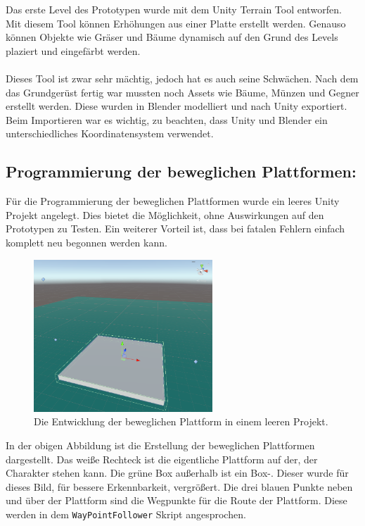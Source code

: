 Das erste Level des Prototypen wurde mit dem Unity Terrain Tool entworfen. Mit diesem Tool können Erhöhungen aus einer Platte erstellt werden. Genauso können Objekte wie Gräser und Bäume dynamisch auf den Grund des Levels plaziert und eingefärbt werden. \\\\
Dieses Tool ist zwar sehr mächtig, jedoch hat es auch seine Schwächen. Nach dem das Grundgerüst fertig war mussten noch Assets wie Bäume, Münzen und Gegner erstellt werden. Diese wurden in Blender modelliert und nach Unity exportiert. Beim Importieren war es wichtig, zu beachten, dass Unity und Blender ein unterschiedliches Koordinatensystem verwendet. 

\pagebreak


\subsection{Programmierung der beweglichen Plattformen:}

Für die Programmierung der beweglichen Plattformen wurde ein leeres Unity Projekt angelegt. Dies bietet die Möglichkeit, ohne Auswirkungen auf den Prototypen zu Testen. Ein weiterer Vorteil ist, dass bei fatalen Fehlern einfach komplett neu begonnen werden kann. 

\begin{figure}[h]
  \centering
  \includegraphics*[width=0.6\textwidth]{chapters/04/images/V1/MovingPlatformV1.png}
  \caption{Die Entwicklung der beweglichen Plattform in einem leeren Projekt.}
  \label{fig:PE04}
\end{figure}

In der obigen Abbildung ist die Erstellung der beweglichen Plattformen dargestellt. Das weiße Rechteck ist die eigentliche Plattform auf der, der Charakter stehen kann. Die grüne Box außerhalb ist ein Box-. Dieser wurde für dieses Bild, für bessere Erkennbarkeit, vergrößert. Die drei blauen Punkte neben und über der Plattform sind die Wegpunkte für die Route der Plattform. Diese werden in dem \verb+WayPointFollower+ Skript angesprochen. \\


